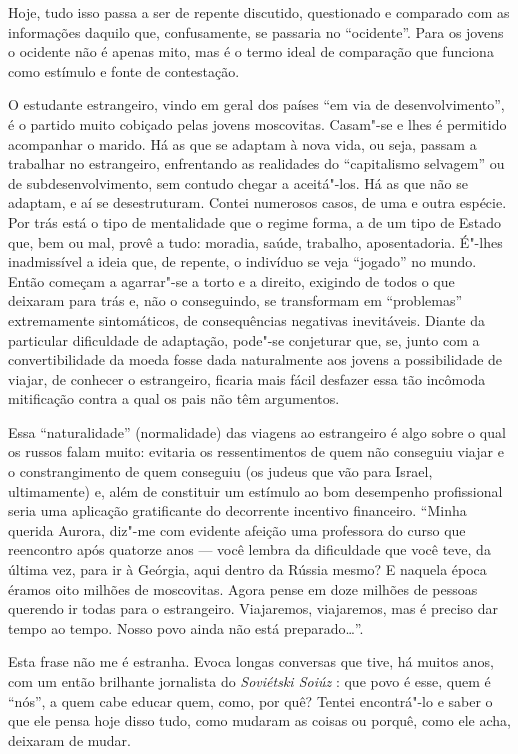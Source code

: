 Hoje, tudo isso passa a ser de repente discutido, questionado e
comparado com as informações daquilo que, confusamente, se passaria no
``ocidente''. Para os jovens o ocidente não é apenas mito, mas é o termo
ideal de comparação que funciona como estímulo e fonte de contestação.

O estudante estrangeiro, vindo em geral dos países ``em via de
desenvolvimento'', é o partido muito cobiçado pelas jovens moscovitas.
Casam"-se e lhes é permitido acompanhar o marido. Há as que se adaptam à
nova vida, ou seja, passam a trabalhar no estrangeiro, enfrentando as
realidades do ``capitalismo selvagem'' ou de subdesenvolvimento, sem
contudo chegar a aceitá"-los. Há as que não se adaptam, e aí se
desestruturam. Contei numerosos casos, de uma e outra espécie. Por trás
está o tipo de mentalidade que o regime forma, a de um tipo de Estado
que, bem ou mal, provê a tudo: moradia, saúde, trabalho, aposentadoria.
É"-lhes inadmissível a ideia que, de repente, o indivíduo se veja
``jogado'' no mundo. Então começam a agarrar"-se a torto e a direito,
exigindo de todos o que deixaram para trás e, não o conseguindo, se
transformam em ``problemas'' extremamente sintomáticos, de consequências
negativas inevitáveis. Diante da particular dificuldade de adaptação,
pode"-se conjeturar que, se, junto com a convertibilidade da moeda fosse
dada naturalmente aos jovens a possibilidade de viajar, de conhecer o
estrangeiro, ficaria mais fácil desfazer essa tão incômoda mitificação
contra a qual os pais não têm argumentos.

Essa ``naturalidade'' (normalidade) das viagens ao estrangeiro é algo
sobre o qual os russos falam muito: evitaria os ressentimentos de quem
não conseguiu viajar e o constrangimento de quem conseguiu (os judeus
que vão para Israel, ultimamente) e, além de constituir um estímulo ao
bom desempenho profissional seria uma aplicação gratificante do
decorrente incentivo financeiro. ``Minha querida Aurora, diz"-me com
evidente afeição uma professora do curso que reencontro após quatorze
anos --- você lembra da dificuldade que você teve, da última vez, para ir
à Geórgia, aqui dentro da Rússia mesmo? E naquela época éramos oito
milhões de moscovitas. Agora pense em doze milhões de pessoas querendo
ir todas para o estrangeiro. Viajaremos, viajaremos, mas é preciso dar
tempo ao tempo. Nosso povo ainda não está preparado\ldots{}''.

Esta frase não me é estranha. Evoca longas conversas que tive, há muitos
anos, com um então brilhante jornalista do \emph{Soviétski Soiúz} : que
povo é esse, quem é ``nós'', a quem cabe educar quem, como, por quê?
Tentei encontrá"-lo e saber o que ele pensa hoje disso tudo, como mudaram
as coisas ou porquê, como ele acha, deixaram de mudar.

